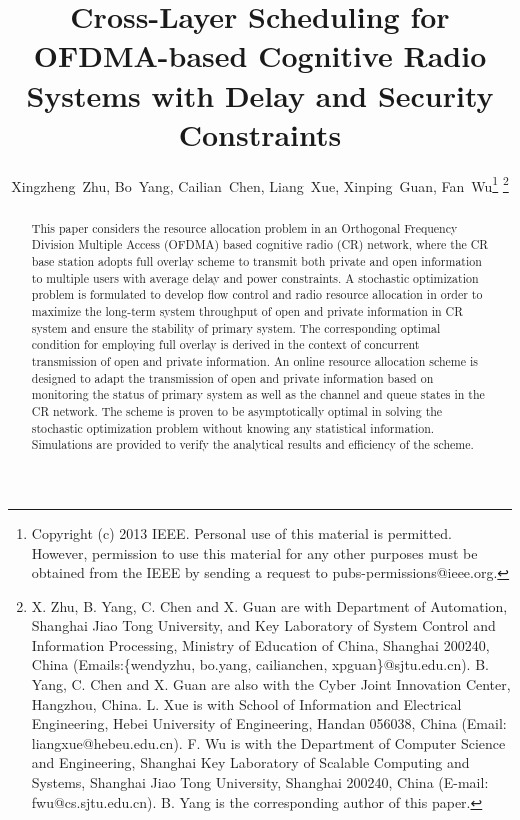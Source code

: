 \documentclass[journal]{IEEEtran}
\begin{document}
\title{Cross-Layer Scheduling for OFDMA-based Cognitive Radio Systems with Delay and Security Constraints}


\author{Xingzheng~Zhu, Bo~Yang, Cailian~Chen, Liang~Xue, Xinping~Guan, Fan~Wu\thanks{Copyright (c) 2013 IEEE. Personal use of this material is permitted. However, permission to use this material for any other purposes must be obtained from the IEEE by sending a request to pubs-permissions@ieee.org.}
\thanks{X. Zhu, B. Yang, C. Chen and X. Guan are with Department of Automation, Shanghai Jiao Tong University, and Key Laboratory of System Control and Information Processing, Ministry of Education of China, Shanghai 200240, China  (Emails:\{wendyzhu, bo.yang, cailianchen, xpguan\}@sjtu.edu.cn). B. Yang, C. Chen and X. Guan are also with the Cyber Joint Innovation Center, Hangzhou, China.  L. Xue is with School of Information and Electrical Engineering, Hebei University of Engineering, Handan 056038, China (Email: liangxue@hebeu.edu.cn). F. Wu is with the Department of Computer Science
and Engineering, Shanghai Key Laboratory of Scalable Computing
and Systems, Shanghai Jiao Tong University, Shanghai 200240, China (E-mail: fwu@cs.sjtu.edu.cn). B. Yang is the corresponding author of this paper.}}



















\maketitle
{ 
\begin{abstract}
 This paper considers the resource allocation problem in an Orthogonal Frequency Division Multiple Access (OFDMA) based cognitive radio (CR) network, where the CR base station adopts full overlay scheme to transmit both private and open information to multiple users with average delay and power constraints. A stochastic optimization problem is formulated to develop flow control and radio resource allocation in order to maximize the long-term system throughput of open and private information in CR system and ensure the stability of primary system. The corresponding optimal condition for employing full overlay is derived in the context of concurrent transmission of open and private information. An online resource allocation scheme is designed to adapt the transmission of open and private information based on monitoring the status of primary system as well as the channel and queue states in the CR network. The scheme is proven to be asymptotically optimal in solving the stochastic optimization problem without knowing any statistical information. Simulations are provided to verify the analytical results and efficiency of the scheme.
\end{abstract}}
\end{document}
